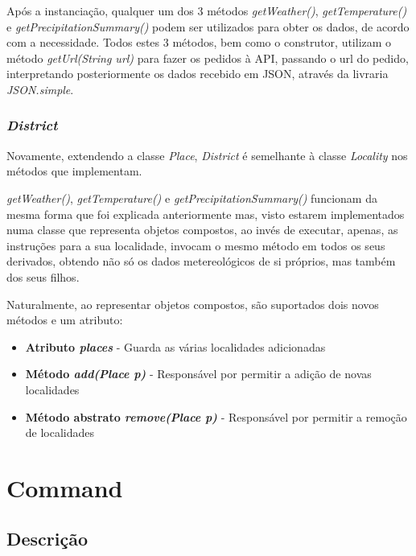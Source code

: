 \documentclass[10pt,portuguese]{article}
\begin{document}
\par Após a instanciação, qualquer um dos 3 métodos \textit{getWeather()}, \textit{getTemperature()} e \textit{getPrecipitationSummary()} podem ser utilizados para obter os dados, de acordo com a necessidade. Todos estes 3 métodos, bem como o construtor, utilizam o método \textit{getUrl(String url)} para fazer os pedidos à API, passando o url do pedido, interpretando posteriormente os dados recebido em JSON, através da livraria \textit{JSON.simple}. 

\subsubsection{\textit{District}}

\par Novamente, extendendo a classe \textit{Place}, \textit{District} é semelhante à classe \textit{Locality} nos métodos que implementam.

\par \textit{getWeather()}, \textit{getTemperature()} e \textit{getPrecipitationSummary()} funcionam da mesma forma que foi explicada anteriormente mas, visto estarem implementados numa classe que representa objetos compostos, ao invés de executar, apenas, as instruções para a sua localidade, invocam o mesmo método em todos os seus derivados, obtendo não só os dados metereológicos de si próprios, mas também dos seus filhos. 

\par Naturalmente, ao representar objetos compostos, são suportados dois novos métodos e um atributo:

\begin{itemize}
    \item \textbf{Atributo \textit{places}} - Guarda as várias localidades adicionadas
    \item \textbf{Método \textit{add(Place p)}} - Responsável por permitir a adição de novas localidades
    \item \textbf{Método abstrato \textit{remove(Place p)}} - Responsável por permitir a remoção de localidades
    
\end{itemize}



\clearpage

\section{Command}
\subsection{Descrição}
\end{document}
